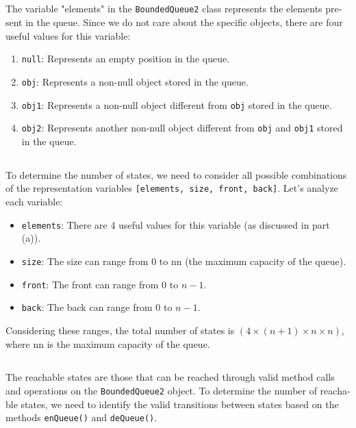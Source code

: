 \documentclass{article}
\begin{document}
\begin{latin}
\subsection{}
The variable "elements" in the \texttt{BoundedQueue2} class represents the elements present in the queue. Since we do not care about the specific objects, there are four useful values for this variable:

\begin{enumerate}
\item \texttt{null}: Represents an empty position in the queue.
\item \texttt{obj}: Represents a non-null object stored in the queue.
\item \texttt{obj1}: Represents a non-null object different from \texttt{obj} stored in the queue.
\item \texttt{obj2}: Represents another non-null object different from \texttt{obj} and \texttt{obj1} stored in the queue.
\end{enumerate}

\subsection{}
To determine the number of states, we need to consider all possible combinations of the representation variables \texttt{[elements, size, front, back]}. Let's analyze each variable:

\begin{itemize}
\item \texttt{elements}: There are 4 useful values for this variable (as discussed in part (a)).
\item \texttt{size}: The size can range from 0 to nn (the maximum capacity of the queue).
\item \texttt{front}: The front can range from 0 to $n−1$.
\item \texttt{back}: The back can range from 0 to $n−1$.
\end{itemize}

Considering these ranges, the total number of states is $(4×(n+1)×n×n)$, where nn is the maximum capacity of the queue.

\subsection{}
The reachable states are those that can be reached through valid method calls and operations on the \texttt{BoundedQueue2} object. To determine the number of reachable states, we need to identify the valid transitions between states based on the methods \texttt{enQueue()} and \texttt{deQueue()}.


\end{latin}
\end{document}
